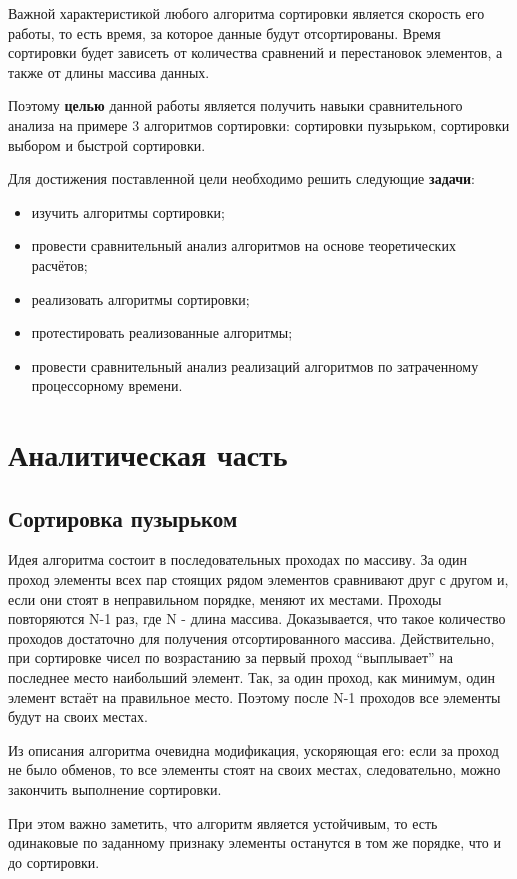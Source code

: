 \documentclass{report}
\begin{document}
Важной характеристикой любого алгоритма сортировки является скорость его работы, то есть время, за которое данные будут отсортированы. Время сортировки будет зависеть от количества сравнений и перестановок элементов, а также от длины массива данных. 

Поэтому \textbf{целью} данной работы является получить навыки сравнительного анализа на примере 3 алгоритмов сортировки: сортировки пузырьком, сортировки выбором и быстрой сортировки. 

Для достижения поставленной цели необходимо решить следующие \textbf{задачи}:
\begin{itemize}
\item изучить алгоритмы сортировки;
\item провести сравнительный анализ алгоритмов на основе теоретических расчётов;
\item реализовать алгоритмы сортировки;
\item протестировать реализованные алгоритмы;
\item провести сравнительный анализ реализаций алгоритмов по затраченному процессорному времени.
\end{itemize}


\chapter{Аналитическая часть}

\section{Сортировка пузырьком}

Идея алгоритма состоит в последовательных проходах по массиву. За один проход элементы всех пар стоящих рядом элементов сравнивают друг с другом и, если они стоят в неправильном порядке, меняют их местами. Проходы повторяются N-1 раз, где N - длина массива. Доказывается, что такое количество проходов достаточно для получения отсортированного массива. Действительно, при сортировке чисел по возрастанию за первый проход ``выплывает'' на последнее место наибольший элемент. Так, за один проход, как минимум, один элемент встаёт на правильное место. Поэтому после N-1 проходов все элементы будут на своих местах. 

Из описания алгоритма очевидна модификация, ускоряющая его: если за проход не было обменов, то все элементы стоят на своих местах, следовательно, можно закончить выполнение сортировки. 

При этом важно заметить, что алгоритм является устойчивым, то есть одинаковые по заданному признаку элементы останутся в том же порядке, что и до сортировки.
\end{document}
